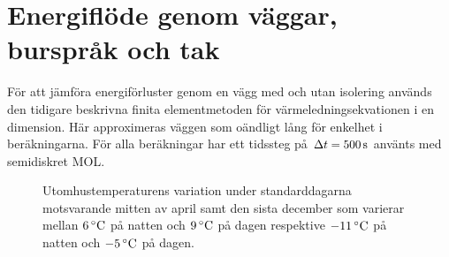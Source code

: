 \section{Energiflöde genom väggar, burspråk och tak}

För att jämföra energiförluster genom en vägg med och utan isolering används
den tidigare beskrivna finita elementmetoden för värmeledningsekvationen i en dimension. Här approximeras
väggen som oändligt lång för enkelhet i beräkningarna. För alla beräkningar har ett tidssteg
på $\Delta t = \unit[500]{s}$ använts med semidiskret MOL.

\begin{figure}[hpbt]
\centering

\vspace{1cm}

\caption{\label{fig:temperaturedist} Utomhustemperaturens variation under standarddagarna motsvarande mitten av april samt den sista december som varierar mellan $\unit[6]{^\circ C}$ på natten och $\unit[9]{^\circ C}$ på dagen respektive $\unit[-11]{^\circ C}$ på natten och $\unit[-5]{^\circ C}$ på dagen.
}
\end{figure}



